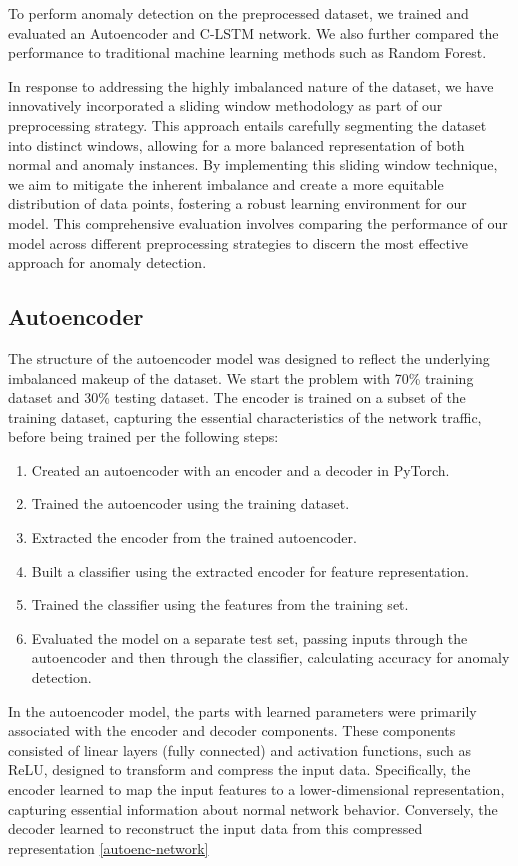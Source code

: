 \documentclass[10pt,twocolumn,letterpaper]{article}
\begin{document}
To perform anomaly detection on the preprocessed dataset, we trained and evaluated an Autoencoder and C-LSTM network. We also further compared the performance to traditional machine learning methods such as Random Forest. 

In response to addressing the highly imbalanced nature of the dataset, we have innovatively incorporated a sliding window methodology as part of our preprocessing strategy. This approach entails 
carefully segmenting the dataset into distinct windows, allowing for a more balanced representation of both normal and anomaly instances. By implementing this sliding window technique, we aim to 
mitigate the inherent imbalance and create a more equitable distribution of data points, fostering a robust learning environment for our model. This comprehensive evaluation involves comparing the 
performance of our model across different preprocessing strategies to discern the most effective approach for anomaly detection.

\subsection{Autoencoder}
The structure of the autoencoder model was designed to reflect the underlying imbalanced makeup of the dataset.
We start the problem with 70\% training dataset and 30\% testing dataset. The encoder is trained on a subset of the training dataset, capturing the essential characteristics of the network traffic, before being trained 
per the following steps:

\begin{enumerate}
    \item Created an autoencoder with an encoder and a decoder in PyTorch.
    \item Trained the autoencoder using the training dataset.
    \item Extracted the encoder from the trained autoencoder.
    \item Built a classifier using the extracted encoder for feature representation.
    \item Trained the classifier using the features from the training set.
    \item Evaluated the model on a separate test set, passing inputs through the autoencoder and then through the classifier, calculating accuracy for anomaly detection.
\end{enumerate}

In the autoencoder model, the parts with learned parameters were primarily associated with the encoder and decoder components. These components consisted of linear layers (fully connected) 
and activation functions, such as ReLU, designed to transform and compress the input data. Specifically, the encoder learned to map the input features to a lower-dimensional representation, 
capturing essential information about normal network behavior. Conversely, the decoder learned to reconstruct the input data from this compressed representation \ref*{autoenc-network}
\end{document}
